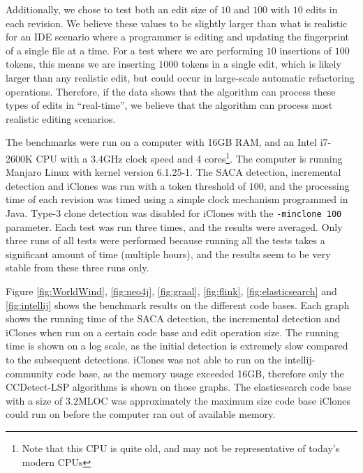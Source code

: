 Additionally, we chose to test both an edit size of $10$ and $100$ with $10$ edits in each
revision. We believe these values to be slightly larger than what is realistic for an IDE
scenario where a programmer is editing and updating the fingerprint of a single file at a
time. For a test where we are performing $10$ insertions of $100$ tokens, this means we
are inserting $1000$ tokens in a single edit, which is likely larger than any realistic
edit, but could occur in large-scale automatic refactoring operations. Therefore, if the
data shows that the algorithm can process these types of edits in ``real-time'', we believe
that the algorithm can process most realistic editing scenarios.

The benchmarks were run on a computer with 16GB RAM, and an Intel i7-2600K CPU with a
3.4GHz clock speed and 4 cores\footnote{Note that this CPU is quite old, and may not be
representative of today's modern CPUs}. The computer is running Manjaro Linux with kernel
version 6.1.25-1. The SACA detection, incremental detection and iClones was run with a
token threshold of $100$, and the processing time of each revision was timed using a
simple clock mechanism programmed in Java. Type-3 clone detection was disabled for iClones
with the \verb|-minclone 100| parameter. Each test was run three times, and the results
were averaged. Only three runs of all tests were performed because running all the tests
takes a significant amount of time (multiple hours), and the results seem to be very
stable from these three runs only.

Figure \ref{fig:WorldWind}, \ref{fig:neo4j}, \ref{fig:graal}, \ref{fig:flink},
\ref{fig:elasticsearch} and \ref{fig:intellij} shows the benchmark results on the
different code bases. Each graph shows the running time of the SACA detection, the
incremental detection and iClones when run on a certain code base and edit operation size.
The running time is shown on a log scale, as the initial detection is extremely slow
compared to the subsequent detections. iClones was not able to run on the
intellij-community code base, as the memory usage exceeded 16GB, therefore only the
CCDetect-LSP algorithms is shown on those graphs. The elasticsearch code base with a size
of $3.2\text{MLOC}$ was approximately the maximum size code base iClones could run on
before the computer ran out of available memory.


